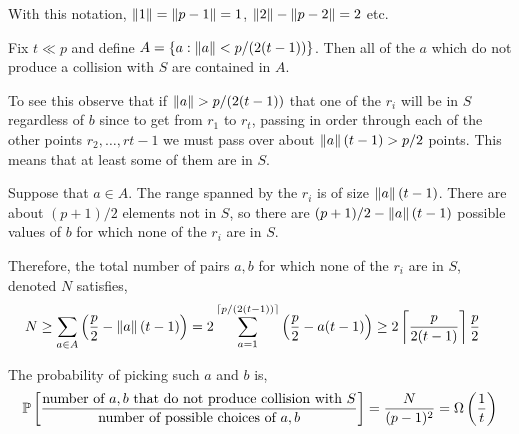 \documentclass[10pt]{article}
\begin{document}
\begin{solution}[Solution]
With this notation, \( \left\lVert1\right\rVert = \left\lVert p-1\right\rVert = 1 \), \( \left\lVert2\right\rVert - \left\lVert p-2\right\rVert = 2 \) etc.


Fix \( t \ll p \) and define \( A = \{a : \left\lVert a\right\rVert <  p/(2(t-1)) \} \). Then all of the \( a \) which do not produce a collision with \( S \) are contained in \( A \).


To see this observe that if \( \left\lVert a\right\rVert > p/(2(t-1)) \) that one of the \( r_i \) will be in \( S \) regardless of \( b \) since to get from \( r_1 \) to \( r_t \), passing in order through each of the other points \( r_2, \ldots, r{t-1} \) we must pass over about \( \left\lVert a\right\rVert(t-1) > p/2 \) points. This means that at least some of them are in \( S \).



Suppose that \( a\in A \). The range spanned by the \( r_i \) is of size \( \left\lVert a\right\rVert(t-1) \). There are about \( (p+1)/2 \) elements not in \( S \), so there are \( (p+1)/2 - \left\lVert a\right\rVert(t-1) \) possible values of \( b \) for which none of the \( r_i \) are in \( S \).

Therefore, the total number of pairs \( a,b \) for which none of the \( r_i \) are in \( S \), denoted \( N \) satisfies,
\begin{align*}
    N &\geq \sum_{a\in A } \left( \frac{p}{2} - \left\lVert a\right\rVert(t-1) \right)
    = 2\sum_{a=1}^{\lceil p/(2(t-1)) \rceil} \left( \frac{p}{2} - a(t-1) \right)
    \geq 2 \left\lceil \frac{p}{2(t-1)} \right\rceil \frac{p}{2}
\end{align*}

\iffalse
Using the identity \( 1+2+\cdots+k = k(k+1)/2 \), we have,
\begin{align*}
    N
    \geq 2 \left\lceil \frac{p}{2t} \right\rceil \frac{p}{2} - 2 (t-1) \frac{1}{2} \left\lceil \frac{p}{2 t} \right\rceil \left( 1+ \left\lceil \frac{p}{2t} \right\rceil \right) 
    \geq \frac{p^2}{2 t}
\end{align*}
\fi

The probability of picking such \( a \) and \( b \) is,
\begin{align*}
    \mathbb{P} \left[ \frac{\text{number of }a,b \text{ that do not produce collision with }S}{\text{number of possible choices of }a,b} \right]
    = \frac{N}{(p-1)^2} = \Omega \left( \frac{1}{t} \right)
\end{align*}







\end{solution}
\end{document}
